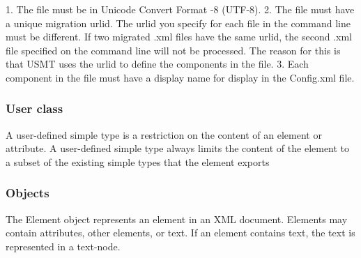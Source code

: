 1. The file must be in Unicode Convert Format -8 (UTF-8).
2. The file must have a unique migration urlid. The urlid you specify for each file in the command line must be different. If two migrated .xml files have the same urlid, the second .xml file specified on the command line will not be processed. The reason for this is that USMT uses the urlid to define the components in the file.
3. Each component in the file must have a display name for display in the Config.xml file.


\subsubsection{User class}

A user-defined simple type is a restriction on the content of an element or attribute. A user-defined simple type always limits the content of the element to a subset of the existing simple types that the element exports


\subsubsection{Objects}
The Element object represents an element in an XML document. Elements may contain attributes, other elements, or text. If an element contains text, the text is represented in a text-node.


